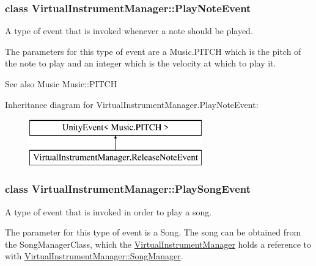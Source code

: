 \subsubsection{class Virtual\+Instrument\+Manager\+:\+:Play\+Note\+Event}
A type of event that is invoked whenever a note should be played. 

The parameters for this type of event are a Music.\+P\+I\+T\+CH which is the pitch of the note to play and an integer which is the velocity at which to play it.

\begin{DoxySeeAlso}{See also}
Music Music\+::\+P\+I\+T\+CH 
\end{DoxySeeAlso}
Inheritance diagram for Virtual\+Instrument\+Manager.\+Play\+Note\+Event\+:\begin{figure}[H]
\begin{center}
\leavevmode
\includegraphics[height=2.000000cm]{group___event_types}
\end{center}
\end{figure}
\label{class_virtual_instrument_manager_1_1_play_song_event}
\subsubsection{class Virtual\+Instrument\+Manager\+:\+:Play\+Song\+Event}
A type of event that is invoked in order to play a song. 

The parameter for this type of event is a Song. The song can be obtained from the Song\+Manager\+Class, which the \hyperlink{group___audio_management_class_virtual_instrument_manager}{Virtual\+Instrument\+Manager} holds a reference to with \hyperlink{group___audio_management_a33dae94932c10c66db76a0eebec76b01}{Virtual\+Instrument\+Manager\+::\+Song\+Manager}.

